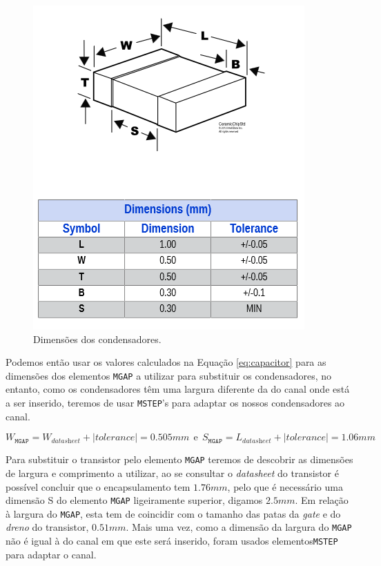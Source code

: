 \documentclass[11pt]{article}
\numberwithin{equation}{section}
\begin{document}
\begin{figure}[H]
	\centering
	\includegraphics[keepaspectratio=true, scale=0.45]{teoricas/capacitor}
	\vspace{-0.5em}
	\caption{Dimensões dos condensadores.}
	\vspace{-0.8em}
	\label{fig:capacitor}
\end{figure}

Podemos então usar os valores calculados na Equação \ref{eq:capacitor} para as dimensões dos elementos \texttt{MGAP} a utilizar para substituir os condensadores, no entanto, como os condensadores têm uma largura diferente da do canal onde está a ser inserido, teremos de usar \texttt{MSTEP}'s para adaptar os nossos condensadores ao canal.

\begin{equation}
W_{\texttt{MGAP}} = W_{\textit{datasheet}} + |tolerance| = 0.505 mm ~~ \text{e} ~~ S_{\texttt{MGAP}} = L_{\textit{datasheet}} + |tolerance| = 1.06 mm
\label{eq:capacitor}
\end{equation}

Para substituir o transistor pelo elemento \texttt{MGAP} teremos de descobrir as dimensões de largura e comprimento a utilizar, ao se consultar o \textit{datasheet} do transistor é possível  concluir que o encapsulamento tem $ 1.76 mm $, pelo que é necessário uma dimensão S do elemento \texttt{MGAP} ligeiramente superior, digamos $ 2.5 mm $. Em relação à largura do \texttt{MGAP}, esta tem de coincidir com o tamanho das patas da \textit{gate} e do \textit{dreno} do transistor, $ 0.51 mm $. Mais uma vez, como a dimensão da largura do \texttt{MGAP} não é igual à do canal em que este será inserido, foram usados elementos\texttt{MSTEP} para adaptar o canal.
\end{document}
